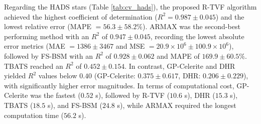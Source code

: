 \documentclass[a4paper,fleqn]{cas-sc}
\begin{document}
\begin{table}[htbp]
\centering
\caption{Cross-validation results for LADS stars ($N=1000$). The computational time is decomposed into Lomb-Scargle Periodogram estimation (LS) and final Model Fit (Fit).}
\label{tab:cv_lads}
\end{table}

Regarding the HADS stars (Table \ref{tab:cv_hads}), the proposed R-TVF algorithm achieved the highest coefficient of determination ($R^2 = 0.987 \pm 0.045$) and the lowest relative error (MAPE $= 56.3 \pm 58.2\%$). ARMAX was the second-best performing method with an $R^2$ of $0.947 \pm 0.045$, recording the lowest absolute error metrics (MAE $= 1386 \pm 3467$ and MSE $= 20.9 \times 10^6 \pm 100.9 \times 10^6$), followed by FS-BSM with an $R^2$ of $0.928 \pm 0.062$ and MAPE of $169.9 \pm 60.5\%$. TBATS reached an $R^2$ of $0.452 \pm 0.154$. In contrast, GP-Celerite and DHR yielded $R^2$ values below $0.40$ (GP-Celerite: $0.375 \pm 0.617$, DHR: $0.206 \pm 0.229$), with significantly higher error magnitudes. In terms of computational cost, GP-Celerite was the fastest ($0.52$ s), followed by R-TVF ($10.6$ s), DHR ($15.3$ s), TBATS ($18.5$ s), and FS-BSM ($24.8$ s), while ARMAX required the longest computation time ($56.2$ s).
\end{document}
